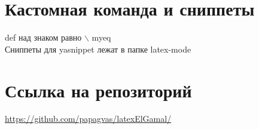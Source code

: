 \documentclass[a4paper,12pt]{report}
\begin{document}
\section{Кастомная команда и сниппеты}

def над знаком равно $\backslash$ myeq \\
Сниппеты для yasnippet лежат в папке latex-mode 

\section{Ссылка на репозиторий }

\url{https://github.com/papagvas/latexElGamal/}
\end{document}
